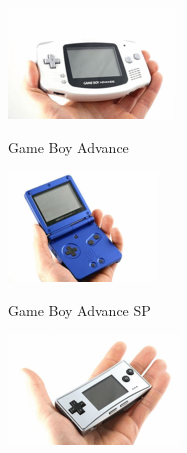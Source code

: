 \begin{figure}[b]
	\centering
	\begin{subfigure}[h]{0.3\textwidth}
		\centering
		\includegraphics[width=\textwidth]{capitulos/capitulo1/modelo_a.png}
		\label{fig:modelo_a}
		\caption{Game Boy Advance}
	\end{subfigure}
	\hfill
	\begin{subfigure}[h]{0.3\textwidth}
		\centering
		\includegraphics[width=\textwidth]{capitulos/capitulo1/modelo_b.png}
		\label{fig:modelo_b}
		\caption{Game Boy Advance SP}
	\end{subfigure}
	\hfill
	\begin{subfigure}[h]{0.3\textwidth}
		\centering
		\includegraphics[width=\textwidth]{capitulos/capitulo1/modelo_c.png}

\end{subfigure}
\end{figure}
